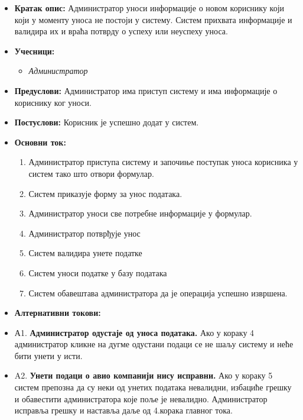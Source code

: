 \documentclass{article}
\begin{document}
\begin{itemize}
    \item \textbf{Кратак опис:} Администратор уноси информације о новом кориснику који који у моменту уноса не постоји у систему. Систем прихвата информације и валидира их и враћа потврду о успеху или неуспеху уноса.
    \item \textbf{Учесници:}
        \begin{itemize}
            \item \textit{Администратор}
        \end{itemize}
    \item \textbf{Предуслови:} Администратор има приступ систему и има информације о кориснику ког уноси.
    \item \textbf{Постуслови:} Корисник је успешно додат у систем.
    \item \textbf{Основни ток:}
        \begin{enumerate}
            \item Администратор приступа систему и започиње поступак уноса корисника у систем тако што отвори формулар.
            \item Систем приказује форму за унос података.
            \item Администратор уноси све потребне информације у формулар.
            \item Администратор потврђује унос
            \item Систем валидира унете податке
            \item Систем уноси податке у базу података
            \item Систем обавештава администратора да је операција успешно извршена.
        \end{enumerate}
    
    \item \textbf{Алтернативни токови:}
    \item А1. \textbf{Администратор одустаје од уноса података.} Ако у кораку 4 администратор кликне на дугме одустани подаци се не шаљу систему и неће бити унети у исти.
    \item A2. \textbf{Унети подаци о авио компанији нису исправни.} Ако у кораку 5 систем препозна да су неки од унетих података невалидни, избациће грешку и обавестити администратора које поље је невалидно. Администратор исправља грешку и наставља даље од 4.корака главног тока. 
\end{itemize}
\end{document}
